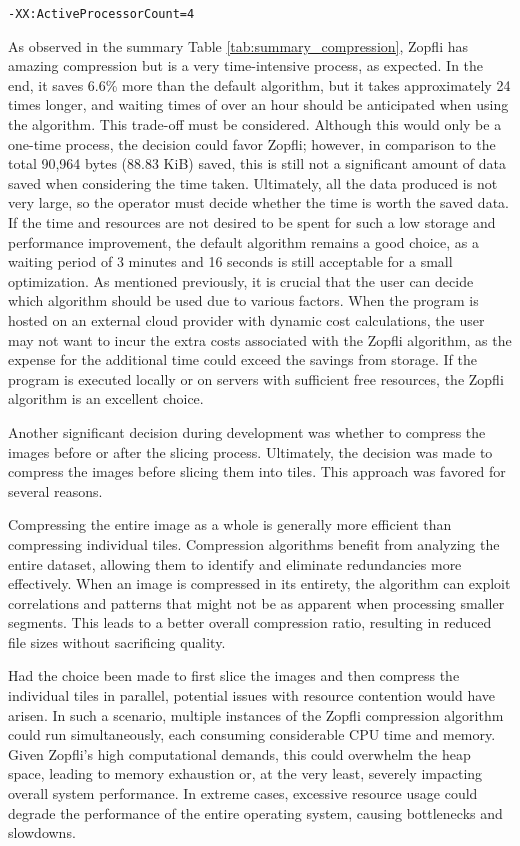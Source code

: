 \texttt{-XX:ActiveProcessorCount=4}

As observed in the summary Table \ref{tab:summary_compression}, Zopfli has amazing compression but is a very time-intensive process, as expected. In the end, it saves 6.6\% more than the default algorithm, but it takes approximately 24 times longer, and waiting times of over an hour should be anticipated when using the algorithm. This trade-off must be considered. Although this would only be a one-time process, the decision could favor Zopfli; however, in comparison to the total 90,964 bytes (88.83 KiB) saved, this is still not a significant amount of data saved when considering the time taken. Ultimately, all the data produced is not very large, so the operator must decide whether the time is worth the saved data. If the time and resources are not desired to be spent for such a low storage and performance improvement, the default algorithm remains a good choice, as a waiting period of 3 minutes and 16 seconds is still acceptable for a small optimization. As mentioned previously, it is crucial that the user can decide which algorithm should be used due to various factors. When the program is hosted on an external cloud provider with dynamic cost calculations, the user may not want to incur the extra costs associated with the Zopfli algorithm, as the expense for the additional time could exceed the savings from storage. If the program is executed locally or on servers with sufficient free resources, the Zopfli algorithm is an excellent choice.

Another significant decision during development was whether to compress the images before or after the slicing process. Ultimately, the decision was made to compress the images before slicing them into tiles. This approach was favored for several reasons.

Compressing the entire image as a whole is generally more efficient than compressing individual tiles. Compression algorithms benefit from analyzing the entire dataset, allowing them to identify and eliminate redundancies more effectively. When an image is compressed in its entirety, the algorithm can exploit correlations and patterns that might not be as apparent when processing smaller segments. This leads to a better overall compression ratio, resulting in reduced file sizes without sacrificing quality.

Had the choice been made to first slice the images and then compress the individual tiles in parallel, potential issues with resource contention would have arisen. In such a scenario, multiple instances of the Zopfli compression algorithm could run simultaneously, each consuming considerable CPU time and memory. Given Zopfli’s high computational demands, this could overwhelm the heap space, leading to memory exhaustion or, at the very least, severely impacting overall system performance. In extreme cases, excessive resource usage could degrade the performance of the entire operating system, causing bottlenecks and slowdowns.

